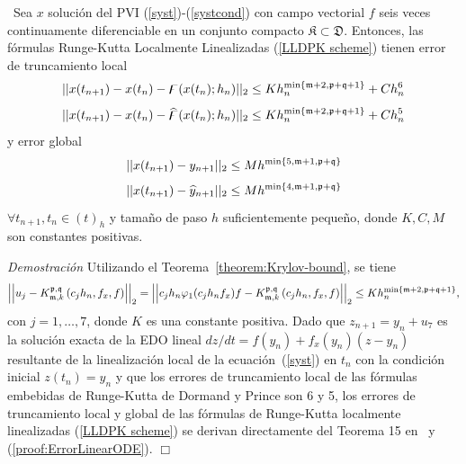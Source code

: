\begin{theorem}\label{theorem:lldp-convergence}
	\cite{naranjo2021locally}~Sea $x$ solución del PVI (\ref{syst})-(\ref{systcond}) con campo vectorial $f$ seis veces continuamente diferenciable en un conjunto compacto $\mathfrak{K} \subset \mathfrak{D}$. Entonces, las fórmulas Runge-Kutta Localmente Linealizadas (\ref{LLDPK scheme}) tienen error de truncamiento local
	\[\lvert\lvert x(t_{n+1}) - x(t_n) - \digamma(x(t_n);h_n) \rvert\rvert_2 \leq Kh_n^{\mathrm{min}\left\{ \mathfrak{m}+2,\mathfrak{p}+\mathfrak{q}+1 \right\}}+C h_n^{6}  \]
	\[\lvert\lvert x(t_{n+1}) - x(t_n) - \widehat{\digamma }(x(t_n);h_n) \rvert\rvert_2 \leq Kh_n^{\mathrm{min}\left\{ \mathfrak{m}+2,\mathfrak{p}+\mathfrak{q}+1 \right\}}+C h_n^{5}  \]
	y error global
	\[ \lvert\lvert x(t_{n+1}) - y_{n+1} \rvert\rvert_2 \leq M h^{\mathrm{min}\left\{5,\mathfrak{m}+1,\mathfrak{p}+\mathfrak{q} \right\}} \]
	\[ \lvert\lvert x(t_{n+1}) - \widehat{y}_{n+1} \rvert\rvert_2 \leq M h^{\mathrm{min}\left\{ 4,\mathfrak{m}+1,\mathfrak{p}+\mathfrak{q} \right\}} \]
	$\forall t_{n+1},t_n\in(t)_h$ y tamaño de paso $h$ suficientemente pequeño, donde  $K,C,M$ son constantes positivas.
\end{theorem}
\emph{Demostración} Utilizando el Teorema~\ref{theorem:Krylov-bound}, se tiene
\begin{equation}\label{proof:ErrorLinearODE}
\left\lvert \left\lvert  u_j-K_{\mathfrak{m},k}^{\mathfrak{p},\mathfrak{q}}\left(c_j h_n,f_x , f \right)  \right\rvert \right\rvert_2 =  \left\lvert \left\lvert c_jh_n\varphi_1(c_jh_nf_x)f - K_{\mathfrak{m},k}^{\mathfrak{p},\mathfrak{q}}\left(c_j h_n, f_x , f \right)  \right\rvert \right\rvert_2 \le Kh_n^{\mathrm{min}\left\{ \mathfrak{m}+2,\mathfrak{p}+\mathfrak{q}+1 \right\}},
\end{equation}
con $j=1,\ldots,7$, donde $K$ es una constante positiva. Dado que $z_{n+1} = y_n + u_7$ es la solución exacta de la EDO lineal $dz/dt=f(y_n)+f_x(y_n)(z-y_n)$ resultante de la linealización local de la ecuación~(\ref{syst}) en $t_n$ con la condición inicial $z(t_n)=y_n$ y que los errores de truncamiento local de las fórmulas embebidas de Runge-Kutta de Dormand y Prince son 6 y 5, los errores de truncamiento local y global de las fórmulas de Runge-Kutta localmente linealizadas (\ref{LLDPK scheme}) se derivan directamente del Teorema 15 en~\cite{Jimenez13} y (\ref{proof:ErrorLinearODE}). $\Box$\\

